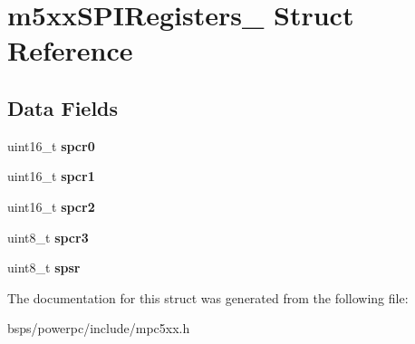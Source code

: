 \hypertarget{structm5xxSPIRegisters__}{}\section{m5xx\+S\+P\+I\+Registers\+\_\+ Struct Reference}
\label{structm5xxSPIRegisters__}
\subsection*{Data Fields}
\begin{DoxyCompactItemize}
\item 
\mbox{\label{structm5xxSPIRegisters___a8b5def1b7b98778b822252cc05207bb0}} 
uint16\+\_\+t {\bfseries spcr0}
\item 
\mbox{\label{structm5xxSPIRegisters___a7371d8d45714e2f9609aaef6424e262f}} 
uint16\+\_\+t {\bfseries spcr1}
\item 
\mbox{\label{structm5xxSPIRegisters___a4ff9478f3c54503f75ea6e5cc6eae12e}} 
uint16\+\_\+t {\bfseries spcr2}
\item 
\mbox{\label{structm5xxSPIRegisters___aa04ceec5689d113ad3b4b1396ddf0a8f}} 
uint8\+\_\+t {\bfseries spcr3}
\item 
\mbox{\label{structm5xxSPIRegisters___a4449dfedf8d59a21ba2912260078c76a}} 
uint8\+\_\+t {\bfseries spsr}
\end{DoxyCompactItemize}


The documentation for this struct was generated from the following file\+:\begin{DoxyCompactItemize}
\item 
bsps/powerpc/include/mpc5xx.\+h\end{DoxyCompactItemize}
